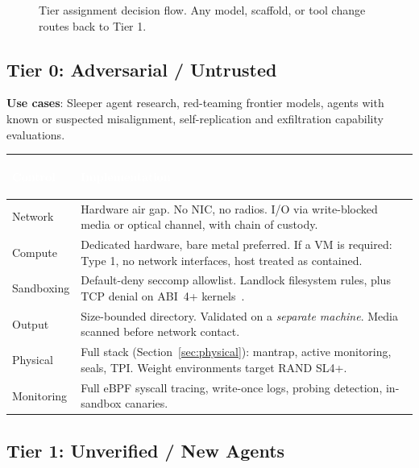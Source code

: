 \documentclass[11pt,letterpaper]{article}
\newcommand{\hrow}{\rowcolor{slategraphite}}
\newcommand{\hdr}[1]{\textcolor{white}{\bfseries\strut #1}}
\begin{document}
\begin{figure}[htbp]
\caption{Tier assignment decision flow. Any model, scaffold, or tool change routes back to Tier 1.}
\label{fig:tierflow}
\end{figure}


\subsection{Tier 0: Adversarial / Untrusted}
\label{sec:tier0}

\textbf{Use cases}: Sleeper agent research, red-teaming frontier models, agents with known or suspected misalignment, self-replication and exfiltration capability evaluations.

\begin{longtable}{L{3cm} L{13cm}}
\hrow \hdr{Control} & \hdr{Implementation} \\
\endhead
Network & Hardware air gap. No NIC, no radios. I/O via write-blocked media or optical channel, with chain of custody. \\
Compute & Dedicated hardware, bare metal preferred. If a VM is required: Type 1, no network interfaces, host treated as contained. \\
Sandboxing & Default-deny seccomp allowlist. Landlock filesystem rules, plus TCP denial on ABI~4+ kernels~\cite{landlock}. \\
Output & Size-bounded directory. Validated on a \emph{separate machine}. Media scanned before network contact. \\
Physical & Full stack (Section~\ref{sec:physical}): mantrap, active monitoring, seals, TPI. Weight environments target RAND SL4+. \\
Monitoring & Full eBPF syscall tracing, write-once logs, probing detection, in-sandbox canaries. \\*
\bottomrule
\end{longtable}

\subsection{Tier 1: Unverified / New Agents}
\label{sec:tier1}
\end{document}
